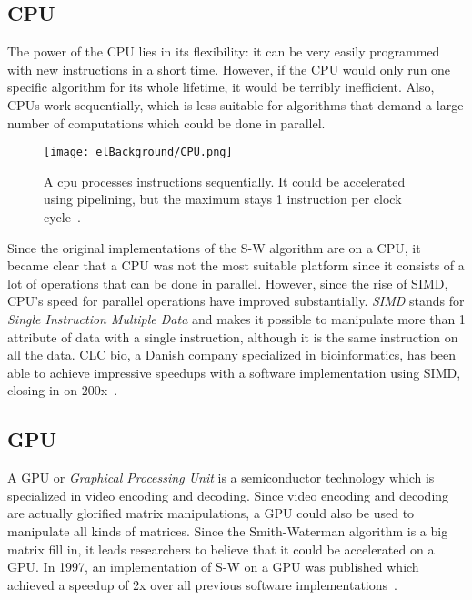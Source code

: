 \subsection{CPU}

The power of the CPU lies in its flexibility: it can be very easily programmed with new instructions in a short time. However, if the CPU would only run one specific algorithm for its whole lifetime, it would be terribly inefficient. Also, CPUs work sequentially, which is less suitable for algorithms that demand a large number of computations which could be done in parallel.

\begin{figure}[H]
	\centering
	\texttt{[image: elBackground/CPU.png]}
	\caption{A cpu processes instructions sequentially. It could be accelerated using pipelining, but the maximum stays 1 instruction per clock cycle~\cite{Lighterra}.}
	\label{fig:cpu}
\end{figure}

Since the original implementations of the S-W algorithm are on a CPU, it became clear that a CPU was not the most suitable platform since it consists of a lot of operations that can be done in parallel. However, since the rise of SIMD, CPU's speed for parallel operations have improved substantially. \emph{SIMD} stands for \emph{Single Instruction Multiple Data} and makes it possible to manipulate more than 1 attribute of data with a single instruction, although it is the same instruction on all the data. CLC bio, a Danish company specialized in bioinformatics, has been able to achieve impressive speedups with a software implementation using SIMD, closing in on 200x~\cite{CLCbio}.

\subsection{GPU}

A GPU or \emph{Graphical Processing Unit} is a semiconductor technology which is specialized in video encoding and decoding. Since video encoding and decoding are actually glorified matrix manipulations, a GPU could also be used to manipulate all kinds of matrices. Since the Smith-Waterman algorithm is a big matrix fill in, it leads researchers to believe that it could be accelerated on a GPU. In 1997, an implementation of S-W on a GPU was published which achieved a speedup of 2x over all previous software implementations~\cite{gpuImpl}.

